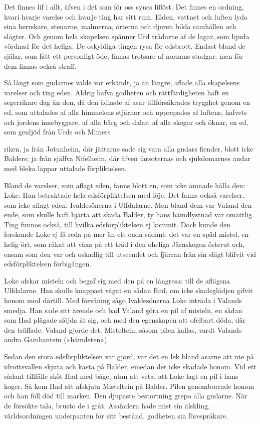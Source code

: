 Det finnes lif i allt, äfven i det som för oss synes liflöst. Det finnes
en ordning, hvari hvarje varelse och hvarje ting har sitt rum. Elden,
vattnet och luften lyda sina herrskare, stenarne, malmerna, örterna och
djuren bilda samhällen och slägter. Och genom hela skapelsen spänner Urd
trådarne af de lagar, som bjuda vördnad för det heliga. De oskyldiga
tingen rysa för edsbrott. Endast bland de själar, som fått ett
personligt öde, finnas trotsare af nornans stadgar; men för dem finnas
också straff.

Så långt som gudarnes välde var erkändt, ja än längre, aflade alla
skapelsens varelser och ting eden. Aldrig hafva godheten och
rättfärdigheten haft en segerrikare dag än den, då den ädlaste af asar
tillförsäkrades trygghet genom en ed, som uttalades af alla himmelens
stjärnor och upprepades af luftens, hafvets och jordens innebyggare, af
alla bärg och dalar, af alla skogar och öknar, en ed, som genljöd från
Urds och Mimers

riken, ja från Jotunheim, där jättarne sade sig vara alla gudars
fiender, blott icke Balders; ja från själfva Nifelheim, där äfven
farsoternas och sjukdomarnes andar med bleka läppar uttalade
förpliktelsen.

Bland de varelser, som aflagt eden, fanns blott en, som icke ämnade
hålla den: Loke. Han betraktade hela edsförpliktelsen med löje. Det
fanns också varelser, som icke aflagt eden: Ivaldesönerna i Ulfdalarne.
Men bland dem var Valand den ende, som skulle haft hjärta att skada
Balder, ty hans hämdlystnad var omättlig. Ting funnos också, till hvilka
edsförpliktelsen ej kommit. Dock kunde den forskande Loke ej få reda på
mer än ett enda sådant: det var en späd mistel, en helig ört, som råkat
att växa på ett träd i den oheliga Järnskogen österut och, ensam som den
var och oskadlig till utseendet och fjärran från sin slägt blifvit vid
edsförpliktelsen förbigången.

Loke afskar misteln och begaf sig med den på en långresa: till de
aflägsna Ulfdalarne. Han skulle knappast vågat en sådan färd, om icke
skadeglädjen gifvit honom mod därtill. Med förvåning sågo Ivaldesönerna
Loke inträda i Valands smedja. Han sade sitt ärende och bad Valand göra
en pil af misteln, en sådan som Had plägade slöjda åt sig, och med den
egenskapen att ofelbart döda, där den träffade. Valand gjorde det.
Misteltein, såsom pilen kallas, vardt Valands andra Gambantein
(»hämdeten»).

Sedan den stora edsförpliktelsen var gjord, var det en lek bland asarne
att ute på idrottsvallen skjuta och kasta på Balder, emedan det icke
skadade honom. Vid ett sådant tillfälle sköt Had med båge, utan att
veta, att Loke lagt en pil i hans koger. Så kom Had att afskjuta
Misteltein på Balder. Pilen genomborrade honom och han föll död till
marken. Den djupaste bestörtning grepo alla gudarne. När de försökte
tala, brusto de i gråt. Asafadern hade mist sin älskling,
världsordningen underpanten för sitt bestånd, godheten sin förespråkare.

